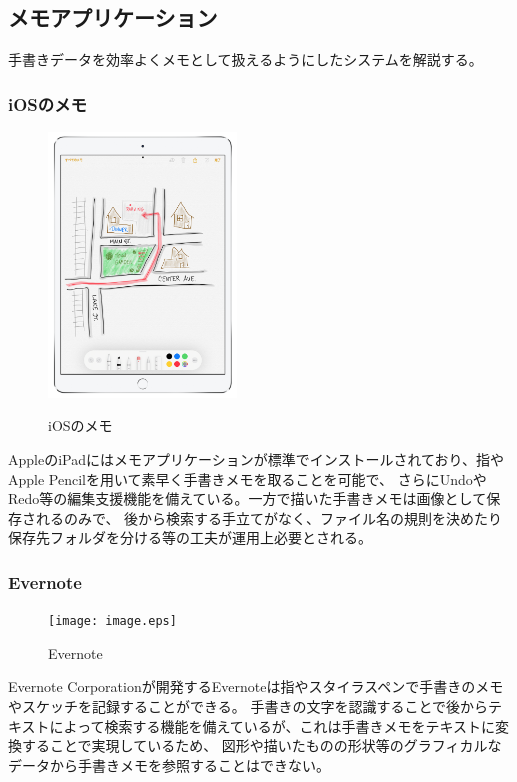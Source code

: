 \subsection{メモアプリケーション}
手書きデータを効率よくメモとして扱えるようにしたシステムを解説する。

\subsubsection{iOSのメモ}

\begin{figure}[htbp]
    \begin{center}
        {\includegraphics[width=50mm]{images/applememo.png}} \end{center}
    \caption{iOSのメモ}
\end{figure}

AppleのiPadにはメモアプリケーションが標準でインストールされており、指やApple Pencilを用いて素早く手書きメモを取ることを可能で、
さらにUndoやRedo等の編集支援機能を備えている。一方で描いた手書きメモは画像として保存されるのみで、
後から検索する手立てがなく、ファイル名の規則を決めたり保存先フォルダを分ける等の工夫が運用上必要とされる。

\subsubsection{Evernote}

\begin{figure}[htbp]
    \begin{center}
    {\texttt{[image: image.eps]}} \end{center}
    \caption{Evernote}
\end{figure}

Evernote Corporationが開発するEvernoteは指やスタイラスペンで手書きのメモやスケッチを記録することができる。
手書きの文字を認識することで後からテキストによって検索する機能を備えているが、これは手書きメモをテキストに変換することで実現しているため、
図形や描いたものの形状等のグラフィカルなデータから手書きメモを参照することはできない。

